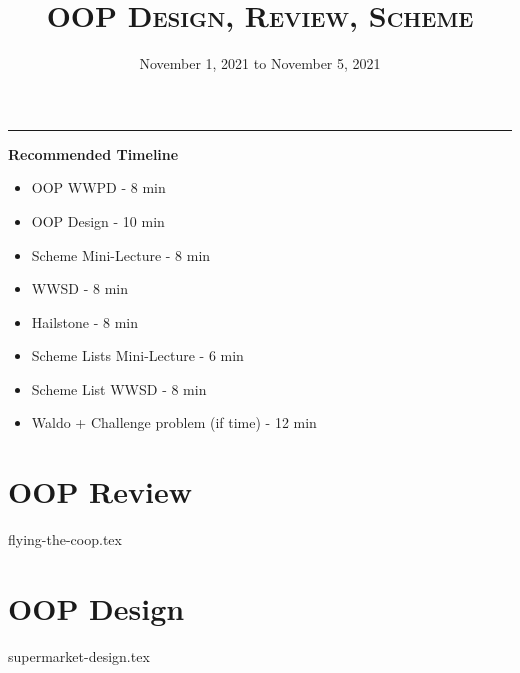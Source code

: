 \documentclass{exam}
\title{\textsc{OOP Design, Review, Scheme}}
\date{November 1, 2021 to November 5, 2021}
\begin{document}
\maketitle
\rule{\textwidth}{0.15em}
\fontsize{12}{15}\selectfont

\begin{guide}
\begin{blocksection}
\textbf{Recommended Timeline}
\begin{itemize}
  \item OOP WWPD - 8 min
  \item OOP Design - 10 min
  \item Scheme Mini-Lecture - 8 min
  \item WWSD - 8 min
  \item Hailstone - 8 min
  \item Scheme Lists Mini-Lecture - 6 min
  \item Scheme List WWSD - 8 min
  \item Waldo + Challenge problem (if time) - 12 min
\end{itemize}
\end{blocksection}
\end{guide}

\section{OOP Review}
\begin{questions}
{flying-the-coop.tex}
\end{questions}


\section{OOP Design}
\begin{questions}
{supermarket-design.tex}
\end{questions}
\newpage
\end{document}
